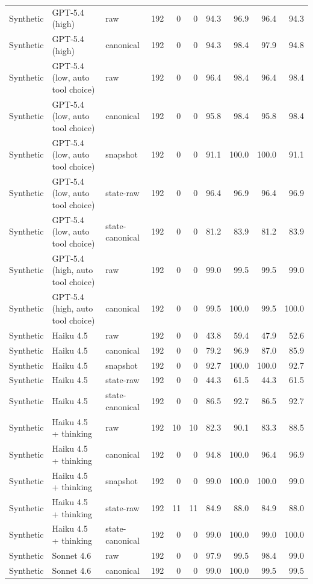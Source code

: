 {\begin{longtable}{lllrrrrrrr}
Synthetic & GPT-5.4 (high) & raw & 192 & 0 & 0 & 94.3 & 96.9 & 96.4 & 94.3 \\
Synthetic & GPT-5.4 (high) & canonical & 192 & 0 & 0 & 94.3 & 98.4 & 97.9 & 94.8 \\
Synthetic & GPT-5.4 (low, auto tool choice) & raw & 192 & 0 & 0 & 96.4 & 98.4 & 96.4 & 98.4 \\
Synthetic & GPT-5.4 (low, auto tool choice) & canonical & 192 & 0 & 0 & 95.8 & 98.4 & 95.8 & 98.4 \\
Synthetic & GPT-5.4 (low, auto tool choice) & snapshot & 192 & 0 & 0 & 91.1 & 100.0 & 100.0 & 91.1 \\
Synthetic & GPT-5.4 (low, auto tool choice) & state-raw & 192 & 0 & 0 & 96.4 & 96.9 & 96.4 & 96.9 \\
Synthetic & GPT-5.4 (low, auto tool choice) & state-canonical & 192 & 0 & 0 & 81.2 & 83.9 & 81.2 & 83.9 \\
Synthetic & GPT-5.4 (high, auto tool choice) & raw & 192 & 0 & 0 & 99.0 & 99.5 & 99.5 & 99.0 \\
Synthetic & GPT-5.4 (high, auto tool choice) & canonical & 192 & 0 & 0 & 99.5 & 100.0 & 99.5 & 100.0 \\
Synthetic & Haiku 4.5 & raw & 192 & 0 & 0 & 43.8 & 59.4 & 47.9 & 52.6 \\
Synthetic & Haiku 4.5 & canonical & 192 & 0 & 0 & 79.2 & 96.9 & 87.0 & 85.9 \\
Synthetic & Haiku 4.5 & snapshot & 192 & 0 & 0 & 92.7 & 100.0 & 100.0 & 92.7 \\
Synthetic & Haiku 4.5 & state-raw & 192 & 0 & 0 & 44.3 & 61.5 & 44.3 & 61.5 \\
Synthetic & Haiku 4.5 & state-canonical & 192 & 0 & 0 & 86.5 & 92.7 & 86.5 & 92.7 \\
Synthetic & Haiku 4.5 + thinking & raw & 192 & 10 & 10 & 82.3 & 90.1 & 83.3 & 88.5 \\
Synthetic & Haiku 4.5 + thinking & canonical & 192 & 0 & 0 & 94.8 & 100.0 & 96.4 & 96.9 \\
Synthetic & Haiku 4.5 + thinking & snapshot & 192 & 0 & 0 & 99.0 & 100.0 & 100.0 & 99.0 \\
Synthetic & Haiku 4.5 + thinking & state-raw & 192 & 11 & 11 & 84.9 & 88.0 & 84.9 & 88.0 \\
Synthetic & Haiku 4.5 + thinking & state-canonical & 192 & 0 & 0 & 99.0 & 100.0 & 99.0 & 100.0 \\
Synthetic & Sonnet 4.6 & raw & 192 & 0 & 0 & 97.9 & 99.5 & 98.4 & 99.0 \\
Synthetic & Sonnet 4.6 & canonical & 192 & 0 & 0 & 99.0 & 100.0 & 99.5 & 99.5 \\

\end{longtable}}
